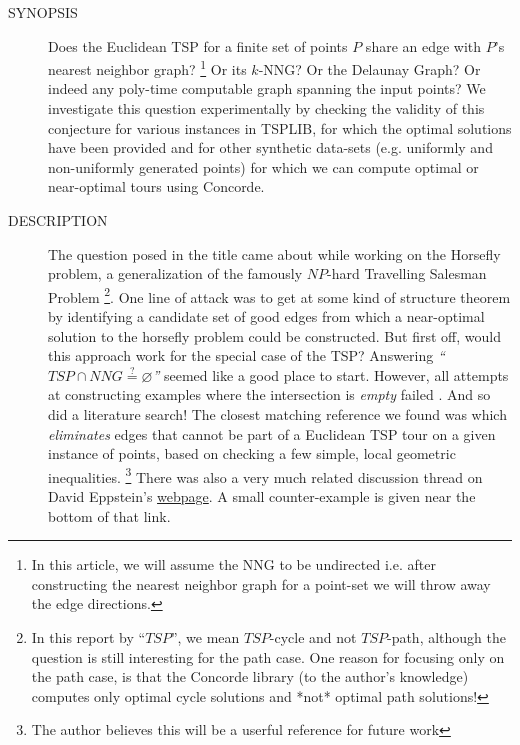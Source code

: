 \vspace{5mm}
\begin{description}
  \item[SYNOPSIS] Does the Euclidean TSP for a finite set of points $P$ share an edge with $P$'s nearest neighbor graph? \footnote{In this article, we will assume the NNG to be undirected i.e. after constructing the nearest neighbor graph for a point-set we will throw away the edge directions.}
     Or its $k$-NNG? Or the Delaunay Graph? 
     Or indeed any poly-time computable graph spanning the input points? We investigate
     this question experimentally by checking the validity of this conjecture for  
     various instances  in TSPLIB, for which the optimal solutions
     have been provided and for other synthetic data-sets (e.g. uniformly and non-uniformly generated points)
     for which we can compute optimal or near-optimal tours using Concorde. 
                   
  \item[DESCRIPTION] The question posed in the title came about while working on the Horsefly problem, 
     a generalization of the famously $NP$-hard Travelling Salesman Problem \footnote{In this report by ``$TSP$'', we mean $TSP$-cycle and not $TSP$-path, although the question is still interesting for the path case. One reason for focusing only on the path case, is that the Concorde library (to the author's knowledge) computes only optimal cycle solutions and *not* optimal path solutions!}. 
     One line of attack was to get at some kind of structure theorem by identifying  a candidate set of good edges from which a near-optimal solution to the 
     horsefly problem could be constructed. But first off, would this approach work for the special case of the  TSP?  Answering
     \textit{``$TSP \cap NNG \stackrel{?}{=} \varnothing$''} seemed like a good place to start.  However, all attempts  
     at constructing examples where the intersection is \textit{empty} failed . And so did a
     literature search! The closest matching reference we found was \cite{hougardy2014edge} which \textit{eliminates} edges 
     that cannot be part of a Euclidean TSP tour on a given instance of points, based on checking a few simple, local geometric inequalities. \footnote{The author believes this will be a userful reference for future work}
     There was also a very much related discussion thread on David Eppstein's \href{https://www.ics.uci.edu/~eppstein/junkyard/dt-not-tsp.html}{webpage}. 
     A small counter-example is given near the bottom of that link. 
     

\end{description}
